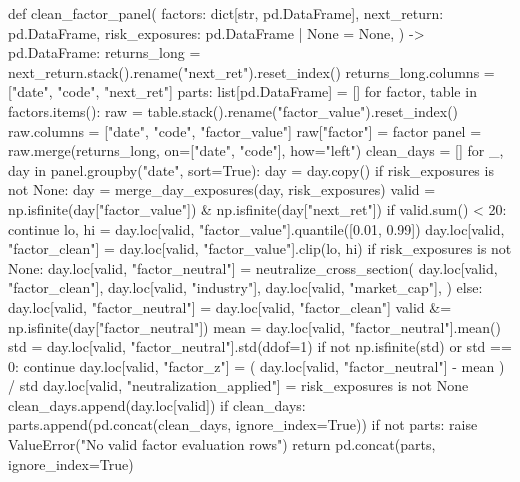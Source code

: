 \documentclass[UTF8,a4paper,fontset=fandol]{ctexart}
\begin{document}
\begin{ProjectCode}
{def clean_factor_panel(
    factors: dict[str, pd.DataFrame],
    next_return: pd.DataFrame,
    risk_exposures: pd.DataFrame | None = None,
) -> pd.DataFrame:
    returns_long = next_return.stack().rename("next_ret").reset_index()
    returns_long.columns = ["date", "code", "next_ret"]
    parts: list[pd.DataFrame] = []
    for factor, table in factors.items():
        raw = table.stack().rename("factor_value").reset_index()
        raw.columns = ["date", "code", "factor_value"]
        raw["factor"] = factor
        panel = raw.merge(returns_long, on=["date", "code"], how="left")
        clean_days = []
        for _, day in panel.groupby("date", sort=True):
            day = day.copy()
            if risk_exposures is not None:
                day = merge_day_exposures(day, risk_exposures)
            valid = np.isfinite(day["factor_value"]) & np.isfinite(day["next_ret"])
            if valid.sum() < 20:
                continue
            lo, hi = day.loc[valid, "factor_value"].quantile([0.01, 0.99])
            day.loc[valid, "factor_clean"] = day.loc[valid, "factor_value"].clip(lo, hi)
            if risk_exposures is not None:
                day.loc[valid, "factor_neutral"] = neutralize_cross_section(
                    day.loc[valid, "factor_clean"],
                    day.loc[valid, "industry"],
                    day.loc[valid, "market_cap"],
                )
            else:
                day.loc[valid, "factor_neutral"] = day.loc[valid, "factor_clean"]
            valid &= np.isfinite(day["factor_neutral"])
            mean = day.loc[valid, "factor_neutral"].mean()
            std = day.loc[valid, "factor_neutral"].std(ddof=1)
            if not np.isfinite(std) or std == 0:
                continue
            day.loc[valid, "factor_z"] = (
                day.loc[valid, "factor_neutral"] - mean
            ) / std
            day.loc[valid, "neutralization_applied"] = risk_exposures is not None
            clean_days.append(day.loc[valid])
        if clean_days:
            parts.append(pd.concat(clean_days, ignore_index=True))
    if not parts:
        raise ValueError("No valid factor evaluation rows")
    return pd.concat(parts, ignore_index=True)


}
\end{ProjectCode}
\end{document}
